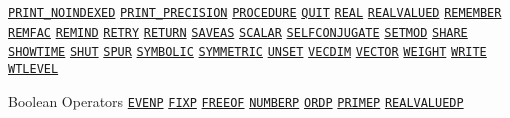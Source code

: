 \begin{list}{}
\hyperlink{command:PRINT_NOINDEXED}{\texttt{PRINT\_NOINDEXED}}
\hyperlink{command:PRINT_PRECISION}{\texttt{PRINT\_PRECISION}}
\hyperlink{command:PROCEDURE}{\texttt{PROCEDURE}}
\hyperlink{command:QUIT}{\texttt{QUIT}}
\hyperlink{command:REAL}{\texttt{REAL}}
\hyperlink{command:REALVALUED}{\texttt{REALVALUED}}
\hyperlink{command:REMEMBER}{\texttt{REMEMBER}}
\hyperlink{command:REMFAC}{\texttt{REMFAC}}
\hyperlink{command:REMIND}{\texttt{REMIND}}
\hyperlink{command:RETRY}{\texttt{RETRY}}
\hyperlink{command:RETURN}{\texttt{RETURN}}
\hyperlink{command:SAVEAS}{\texttt{SAVEAS}}
\hyperlink{command:SCALAR}{\texttt{SCALAR}}
\hyperlink{command:SELFCONJUGATE}{\texttt{SELFCONJUGATE}}
\hyperlink{command:SETMOD}{\texttt{SETMOD}}
\hyperlink{command:SHARE}{\texttt{SHARE}}
\hyperlink{command:SHOWTIME}{\texttt{SHOWTIME}}
\hyperlink{command:SHUT}{\texttt{SHUT}}
\hyperlink{command:SPUR}{\texttt{SPUR}}
\hyperlink{target:modes}{\texttt{SYMBOLIC}}
\hyperlink{reserved:SYMMETRIC}{\texttt{SYMMETRIC}}
\hyperlink{command:UNSET}{\texttt{UNSET}}
\hyperlink{command:VECDIM}{\texttt{VECDIM}}
\hyperlink{command:VECTOR}{\texttt{VECTOR}}
\hyperlink{command:WEIGHT}{\texttt{WEIGHT}}
\hyperlink{command:WRITE}{\texttt{WRITE}}
\hyperlink{command:WTLEVEL}{\texttt{WTLEVEL}}
\halfinterwordspace

\item[Boolean Operators] \doubleinterwordspace
\hyperlink{operator:EVENP}{\texttt{EVENP}}
\hyperlink{operator:FIXP}{\texttt{FIXP}}
\hyperlink{operator:FREEOF}{\texttt{FREEOF}}
\hyperlink{operator:NUMBERP}{\texttt{NUMBERP}}
\hyperlink{operator:ORDP}{\texttt{ORDP}}
\hyperlink{operator:PRIMEP}{\texttt{PRIMEP}}
\hyperlink{operator:REALVALUEDP}{\texttt{REALVALUEDP}}
\halfinterwordspace


\end{list}
